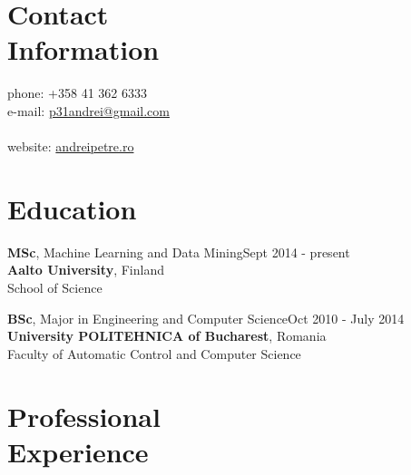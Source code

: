 \documentclass[margin,line]{resume}
\begin{document}
\begin{resume}

    \section{\mysidestyle Contact\\Information}

	phone: +358 41 362 6333              \\
	e-mail:  \href{mailto:p31andrei@gmail.com}{p31andrei@gmail.com}  \vspace{0mm}\\\vspace{-4.5mm}\\%
	website: \href{http://andreipetre.ro}{andreipetre.ro}

    \section{\mysidestyle Education}
    
	\textbf{MSc}, Machine Learning and Data Mining\hfill Sept 2014 - present\\
	\textbf{Aalto University}, Finland\\
    School of Science

	\textbf{BSc}, Major in Engineering and Computer Science\hfill Oct 2010 - July 2014\\
	\textbf{University POLITEHNICA of Bucharest}, Romania\\
    Faculty of Automatic Control and Computer Science

    \section{\mysidestyle Professional\\Experience}
    

\end{resume}
\end{document}
